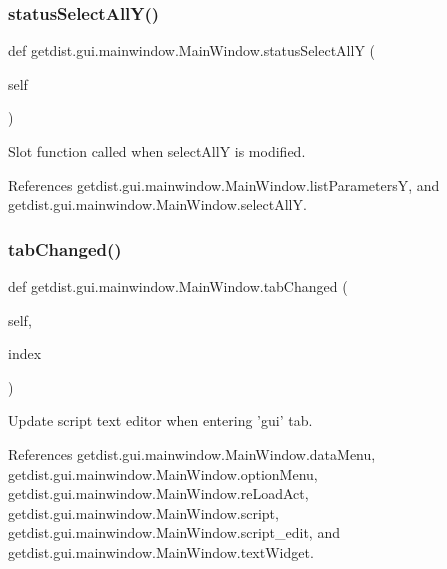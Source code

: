 \subsubsection{\texorpdfstring{status\+Select\+All\+Y()}{statusSelectAllY()}}
{\footnotesize\ttfamily def getdist.\+gui.\+mainwindow.\+Main\+Window.\+status\+Select\+AllY (\begin{DoxyParamCaption}\item[{}]{self }\end{DoxyParamCaption})}

\begin{DoxyVerb}Slot function called when selectAllY is modified.
\end{DoxyVerb}
 

References getdist.\+gui.\+mainwindow.\+Main\+Window.\+list\+ParametersY, and getdist.\+gui.\+mainwindow.\+Main\+Window.\+select\+AllY.

\mbox{\label{classgetdist_1_1gui_1_1mainwindow_1_1MainWindow_a32c6fbc517559d78aa3af57f43ab6eb7}} 
\subsubsection{\texorpdfstring{tab\+Changed()}{tabChanged()}}
{\footnotesize\ttfamily def getdist.\+gui.\+mainwindow.\+Main\+Window.\+tab\+Changed (\begin{DoxyParamCaption}\item[{}]{self,  }\item[{}]{index }\end{DoxyParamCaption})}

\begin{DoxyVerb}Update script text editor when entering 'gui' tab.
\end{DoxyVerb}
 

References getdist.\+gui.\+mainwindow.\+Main\+Window.\+data\+Menu, getdist.\+gui.\+mainwindow.\+Main\+Window.\+option\+Menu, getdist.\+gui.\+mainwindow.\+Main\+Window.\+re\+Load\+Act, getdist.\+gui.\+mainwindow.\+Main\+Window.\+script, getdist.\+gui.\+mainwindow.\+Main\+Window.\+script\+\_\+edit, and getdist.\+gui.\+mainwindow.\+Main\+Window.\+text\+Widget.

\mbox{\label{classgetdist_1_1gui_1_1mainwindow_1_1MainWindow_ad510d3ac614da224ce874b5e905ff51c}} 
